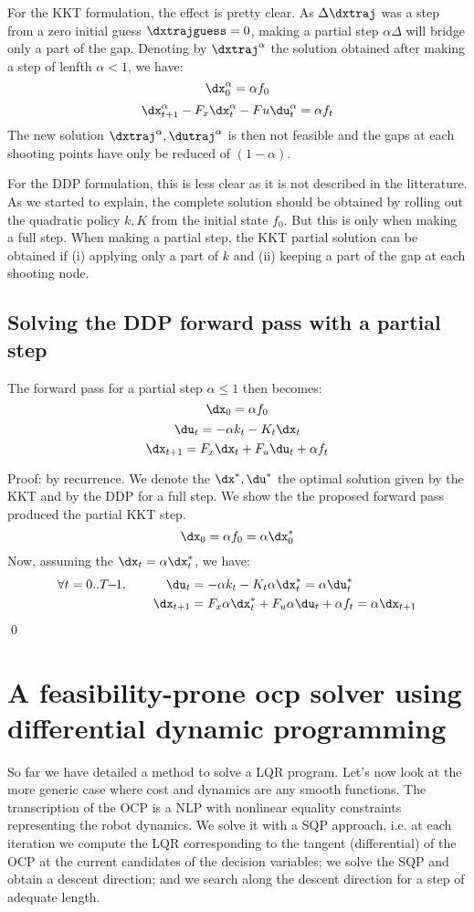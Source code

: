\documentclass[10pt,a4paper]{article}
\begin{document}
For the KKT formulation, the effect is pretty clear. As $\Delta \dxtraj$ was a step from a zero initial guess $\dxtrajguess = 0$, making a partial step $\alpha \Delta$ will bridge only a part of the gap. Denoting by $\dxtraj^\alpha$ the solution obtained after making a step of lenfth $\alpha<1$, we have:
$$\dx_0^\alpha = \alpha f_0$$
$$\dx_{t+1}^\alpha - F_x \dx_t^\alpha - Fu \du_t^\alpha = \alpha f_t$$ 
The new solution  $\dxtraj^\alpha,\dutraj^\alpha$ is then not feasible and the gaps at each shooting points have only be reduced of $(1-\alpha)$.

For the DDP formulation, this is less clear as it is not described in the litterature.
As we started to explain, the complete solution should be obtained by rolling out the quadratic policy $k,K$ from the initial state $f_0$.
But this is only when making a full step.
When making a partial step, the KKT partial solution can be obtained if (i) applying only a part of $k$ and (ii) keeping a part of the gap at each shooting node.

\subsection{Solving the DDP forward pass with a partial step}

The forward pass for a partial step $\alpha \le 1$ then becomes:
$$\dx_0 = \alpha f_0$$
$$\du_t = -\alpha k_t - K_t \dx_t$$
$$\dx_{t+1} = F_x \dx_t + F_u \du_t + \alpha f_t$$

Proof: by recurrence. We denote the $\dx^*,\du^*$ the optimal solution given by the KKT and by the DDP for a full step. We show the the proposed forward pass produced the partial KKT step.
$$\dx_0 = \alpha f_0 = \alpha \dx_0^*$$
Now, assuming the $\dx_t = \alpha \dx_t^*$, we have:
\begin{align*}
  \forall t=0..T\!\!-\!\!1,\quad\quad\quad \du_t &= -\alpha k_t - K_t \alpha \dx_t^* = \alpha \du_t^*\\
 \dx_{t+1} &= F_x \alpha  \dx_t^* + F_u \alpha \du_t + \alpha f_t = \alpha \dx_{t+1}
\end{align*}
\qed


\section{A feasibility-prone ocp solver using differential dynamic programming}

So far we have detailed a method to solve a LQR program. Let's now look at the more generic case where cost and dynamics are any smooth functions.
The transcription of the OCP is a NLP with nonlinear equality constraints representing the robot dynamics.
We solve it with a SQP approach, i.e. at each iteration we compute the LQR corresponding to the tangent (differential) of the OCP at the current candidates of the decision variables; we solve the SQP and obtain a descent direction; and we search along the descent direction for a step of adequate length.
\end{document}
